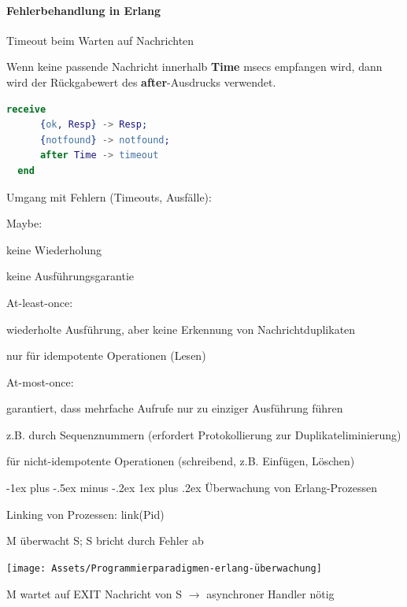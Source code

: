 \documentclass[10pt]{article}
\makeatletter
\renewcommand{\subsubsection}{\@startsection{subsubsection}{3}{0mm}%
                                {-1ex plus -.5ex minus -.2ex}%
                                {1ex plus .2ex}%
                                {\normalfont\small\bfseries}}
\makeatother
\begin{document}
\paragraph{Fehlerbehandlung in Erlang}

\begin{itemize*}
  \item Timeout beim Warten auf Nachrichten
  \item Wenn keine passende Nachricht innerhalb \textbf{Time} msecs empfangen wird, dann wird der Rückgabewert des \textbf{after}-Ausdrucks verwendet.
\end{itemize*}
\begin{lstlisting}[language=erlang]
  receive
      {ok, Resp} -> Resp;
      {notfound} -> notfound;
      after Time -> timeout
  end
  \end{lstlisting}

Umgang mit Fehlern (Timeouts, Ausfälle):
\begin{itemize*}
  \item Maybe:
  \begin{itemize*}
    \item keine Wiederholung
    \item keine Ausführungsgarantie
  \end{itemize*}
  \item At-least-once:
  \begin{itemize*}
    \item wiederholte Ausführung, aber keine Erkennung von Nachrichtduplikaten
    \item nur für idempotente Operationen (Lesen)
  \end{itemize*}
  \item At-most-once:
  \begin{itemize*}
    \item garantiert, dass mehrfache Aufrufe nur zu einziger Ausführung führen
    \item z.B. durch Sequenznummern (erfordert Protokollierung zur Duplikateliminierung)
    \item für nicht-idempotente Operationen (schreibend, z.B. Einfügen, Löschen)
  \end{itemize*}
\end{itemize*}

\subsubsection{Überwachung von Erlang-Prozessen}
\begin{itemize*}
  \item Linking von Prozessen: \color{green}link\color{blue}(Pid) \color{black}
  \item M überwacht S; S bricht durch Fehler ab
  \begin{center}
    \centering
    \texttt{[image: Assets/Programmierparadigmen-erlang-überwachung]}
  \end{center}
  \item M wartet auf EXIT Nachricht von S $\rightarrow$ asynchroner Handler nötig
\end{itemize*}
\end{document}
